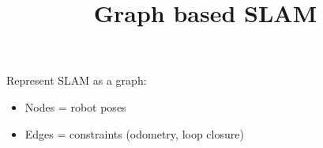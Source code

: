 \documentclass[a4paper]{article}
\title{Graph based SLAM}
\date{}
\begin{document}
    \maketitle
    Represent SLAM as a graph:
    \begin{itemize}
        \item Nodes = robot poses
        \item Edges = constraints (odometry, loop closure)
    \end{itemize}
\end{document}
